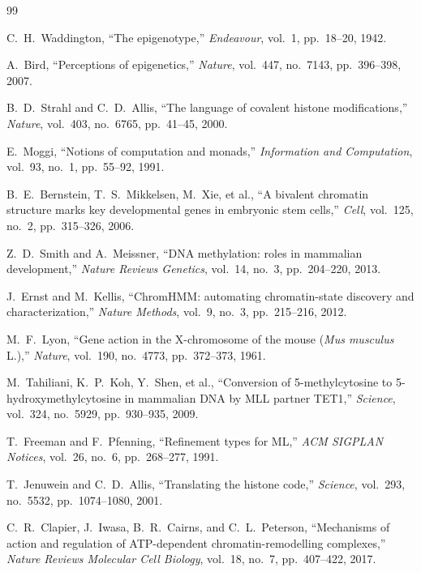\documentclass[12pt,a4paper]{article}
\begin{document}
\newpage
\begin{thebibliography}{99}

C.~H.~Waddington,
``The epigenotype,''
\textit{Endeavour}, vol.~1, pp.~18--20, 1942.

A.~Bird,
``Perceptions of epigenetics,''
\textit{Nature}, vol.~447, no.~7143, pp.~396--398, 2007.

B.~D.~Strahl and C.~D.~Allis,
``The language of covalent histone modifications,''
\textit{Nature}, vol.~403, no.~6765, pp.~41--45, 2000.

E.~Moggi,
``Notions of computation and monads,''
\textit{Information and Computation}, vol.~93, no.~1, pp.~55--92, 1991.

B.~E.~Bernstein, T.~S.~Mikkelsen, M.~Xie, et al.,
``A bivalent chromatin structure marks key developmental genes in embryonic stem cells,''
\textit{Cell}, vol.~125, no.~2, pp.~315--326, 2006.

Z.~D.~Smith and A.~Meissner,
``DNA methylation: roles in mammalian development,''
\textit{Nature Reviews Genetics}, vol.~14, no.~3, pp.~204--220, 2013.

J.~Ernst and M.~Kellis,
``ChromHMM: automating chromatin-state discovery and characterization,''
\textit{Nature Methods}, vol.~9, no.~3, pp.~215--216, 2012.

M.~F.~Lyon,
``Gene action in the X-chromosome of the mouse (\textit{Mus musculus} L.),''
\textit{Nature}, vol.~190, no.~4773, pp.~372--373, 1961.

M.~Tahiliani, K.~P.~Koh, Y.~Shen, et al.,
``Conversion of 5-methylcytosine to 5-hydroxymethylcytosine in mammalian DNA by MLL partner TET1,''
\textit{Science}, vol.~324, no.~5929, pp.~930--935, 2009.

T.~Freeman and F.~Pfenning,
``Refinement types for ML,''
\textit{ACM SIGPLAN Notices}, vol.~26, no.~6, pp.~268--277, 1991.

T.~Jenuwein and C.~D.~Allis,
``Translating the histone code,''
\textit{Science}, vol.~293, no.~5532, pp.~1074--1080, 2001.

C.~R.~Clapier, J.~Iwasa, B.~R.~Cairns, and C.~L.~Peterson,
``Mechanisms of action and regulation of ATP-dependent chromatin-remodelling complexes,''
\textit{Nature Reviews Molecular Cell Biology}, vol.~18, no.~7, pp.~407--422, 2017.


\end{thebibliography}
\end{document}
